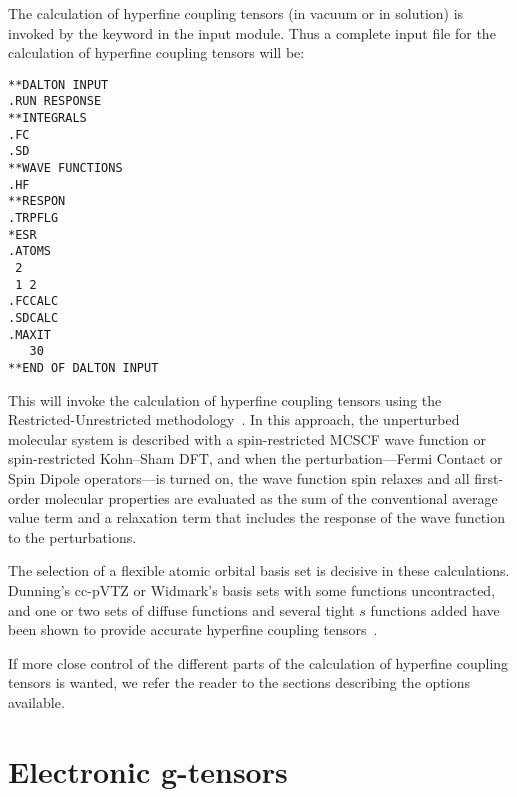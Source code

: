     The calculation of hyperfine coupling tensors (in vacuum or in
solution) is invoked by the keyword  in the 
input module. Thus a complete input file for the calculation of
hyperfine coupling tensors will be:

\begin{verbatim}
**DALTON INPUT
.RUN RESPONSE
**INTEGRALS
.FC
.SD
**WAVE FUNCTIONS
.HF
**RESPON
.TRPFLG
*ESR
.ATOMS
 2
 1 2
.FCCALC
.SDCALC
.MAXIT
   30
**END OF DALTON INPUT
\end{verbatim}
%

    This will invoke the calculation of hyperfine
coupling tensors
using the Restricted-Unrestricted
methodology~\cite{bfpjjbjothhjajjcp97}. In this approach, the
unperturbed molecular system is described with a spin-restricted MCSCF
wave function or spin-restricted Kohn--Sham DFT, and when the perturbation---Fermi Contact or Spin Dipole
operators---is turned on, the wave function spin relaxes and all
first-order molecular properties are evaluated as the sum of the
conventional average value term and a relaxation term that includes
the response of the wave function to the perturbations.

    The selection of a flexible atomic orbital basis set is decisive
in these calculations. Dunning's cc-pVTZ or Widmark's basis sets with some
functions uncontracted, and one or two sets of diffuse functions and
several tight $s$ functions added have been shown to provide accurate
hyperfine coupling tensors~\cite{bfpjcpl232}.

    If more close control of the different parts of the calculation
of hyperfine coupling tensors is wanted, we refer the reader to the
sections describing the options available.

\section{Electronic g-tensors}

\begin{center}
\end{center}

